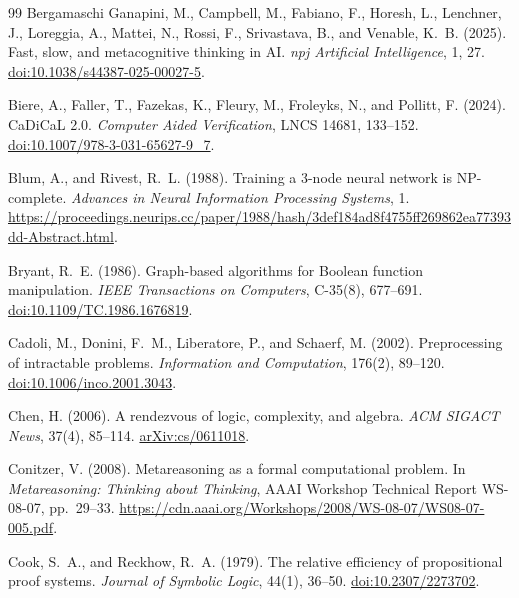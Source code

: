 \documentclass[11pt,a4paper]{article}
\numberwithin{equation}{section}
\theoremstyle{plain}
\theoremstyle{definition}
\theoremstyle{remark}
\begin{document}
\begin{thebibliography}{99}
Bergamaschi Ganapini, M., Campbell, M., Fabiano, F., Horesh, L., Lenchner, J., Loreggia, A., Mattei, N., Rossi, F., Srivastava, B., and Venable, K.~B. (2025).
Fast, slow, and metacognitive thinking in AI.
\emph{npj Artificial Intelligence}, 1, 27.
\href{https://doi.org/10.1038/s44387-025-00027-5}{doi:10.1038/s44387-025-00027-5}.

Biere, A., Faller, T., Fazekas, K., Fleury, M., Froleyks, N., and Pollitt, F. (2024).
CaDiCaL 2.0.
\emph{Computer Aided Verification}, LNCS 14681, 133--152.
\href{https://doi.org/10.1007/978-3-031-65627-9_7}{doi:10.1007/978-3-031-65627-9\_7}.

Blum, A., and Rivest, R.~L. (1988).
Training a 3-node neural network is NP-complete.
\emph{Advances in Neural Information Processing Systems}, 1.
\url{https://proceedings.neurips.cc/paper/1988/hash/3def184ad8f4755ff269862ea77393dd-Abstract.html}.

Bryant, R.~E. (1986).
Graph-based algorithms for Boolean function manipulation.
\emph{IEEE Transactions on Computers}, C-35(8), 677--691.
\href{https://doi.org/10.1109/TC.1986.1676819}{doi:10.1109/TC.1986.1676819}.

Cadoli, M., Donini, F.~M., Liberatore, P., and Schaerf, M. (2002).
Preprocessing of intractable problems.
\emph{Information and Computation}, 176(2), 89--120.
\href{https://doi.org/10.1006/inco.2001.3043}{doi:10.1006/inco.2001.3043}.

Chen, H. (2006).
A rendezvous of logic, complexity, and algebra.
\emph{ACM SIGACT News}, 37(4), 85--114.
\href{https://arxiv.org/abs/cs/0611018}{arXiv:cs/0611018}.

Conitzer, V. (2008).
Metareasoning as a formal computational problem.
In \emph{Metareasoning: Thinking about Thinking}, AAAI Workshop Technical Report WS-08-07, pp.~29--33.
\url{https://cdn.aaai.org/Workshops/2008/WS-08-07/WS08-07-005.pdf}.

Cook, S.~A., and Reckhow, R.~A. (1979).
The relative efficiency of propositional proof systems.
\emph{Journal of Symbolic Logic}, 44(1), 36--50.
\href{https://doi.org/10.2307/2273702}{doi:10.2307/2273702}.


\end{thebibliography}
\end{document}
